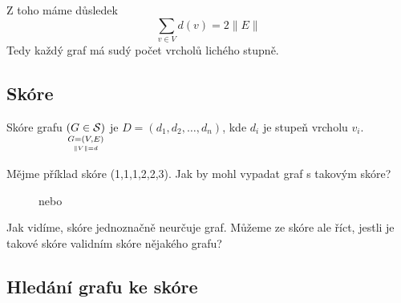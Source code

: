 Z toho máme důsledek
\begin{equation}
    \sum_{v \in V} d(v) = 2 \|E\|
\end{equation}
Tedy každý graf má sudý počet vrcholů lichého stupně.

\subsection{Skóre}
Skóre grafu $\underset{\underset{\|V\|=d}{G=(V,E)}}{(G \in \S)}$ je $D = (d_1, d_2, \dots, d_n)$, kde $d_i$ je stupeň 
vrcholu $v_i$.

Mějme příklad skóre (1,1,1,2,2,3). Jak by mohl vypadat graf s takovým skóre?
\begin{figure}[H]
    \centering
    \begin{minipage}[c]{0.25\textwidth}
        \begin{figure}[H]
        \end{figure}
    \end{minipage}%
    \hspace{0\textwidth}
    nebo
    \hspace{0.05\textwidth}
    \begin{minipage}[c]{0.25\textwidth}
        \begin{figure}[H]
        \end{figure}
    \end{minipage}
\end{figure}
Jak vidíme, skóre jednoznačně neurčuje graf. Můžeme ze skóre ale říct, jestli je takové skóre validním skóre nějakého 
grafu?
\newpage
\subsection{Hledání grafu ke skóre}

